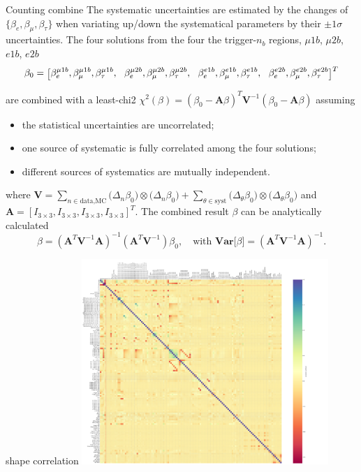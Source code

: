 \begin{frame}{Counting combine}
\smaller
    The systematic uncertainties are estimated by the changes of $\{\beta_{e},\beta_{\mu},\beta_{\tau}\}$ when variating up/down the systematical parameters by their $\pm 1\sigma$ uncertainties.
    The four solutions from the four the trigger-$n_b$ regions, $\mu 1b$, $\mu 2b$, $e1b$, $e2b$
    \begin{equation*}
        \tiny
        \beta_0 = \bigg [
        \beta_e^{\mu1b}, \beta_\mu^{\mu1b}, \beta_\tau^{\mu1b}, \quad 
        \beta_e^{\mu2b}, \beta_\mu^{\mu2b}, \beta_\tau^{\mu2b}, \quad 
        \beta_e^{e1b}, \beta_\mu^{e1b}, \beta_\tau^{e1b}, \quad
        \beta_e^{e2b}, \beta_\mu^{e2b}, \beta_\tau^{e2b}
        \bigg ]^T
    \end{equation*}
    
    are combined with a least-chi2 $\chi^2(\beta) = (\beta_0 - \textbf{A} \beta )^T \textbf{V}^{-1} (\beta_0 - \textbf{A} \beta ) $ assuming
    \begin{itemize}
        \item the statistical uncertainties are uncorrelated;
        \item one source of systematic is fully correlated among the four solutions;
        \item different sources of systematics are mutually independent.
    \end{itemize}

    where 
    $\textbf{V} =
    \sum_{n \in \text{data,MC}} \big( \Delta_{n}\beta_0 \big) \otimes   \big( \Delta_{n}\beta_0 \big) +
    \sum_{\theta \in \text{syst}} \big( \Delta_{\theta}\beta_0 \big) \otimes  \big( \Delta_{\theta}\beta_0 \big)
    $
    and $\textbf{A}=[I_{3\times3}, I_{3\times3}, I_{3\times3}, I_{3\times3}]^T$. The combined result $\beta$ can be analytically calculated 
    \begin{equation*}
        \beta =   (\textbf{A}^T \textbf{V}^{-1} \textbf{A})^{-1}(\textbf{A}^T \textbf{V}^{-1}) \beta_0, \quad
        \text{with } \textbf{Var}\big[\beta\big]  =   (\textbf{A}^T \textbf{V}^{-1} \textbf{A})^{-1} .
    \end{equation*}

\end{frame}



\begin{frame}{shape correlation}
    \centering
    \includegraphics[width=0.7\textwidth]{chapters/Analysis/sectionSystematics/figures/correlation_matrix_full.pdf}
\end{frame}


